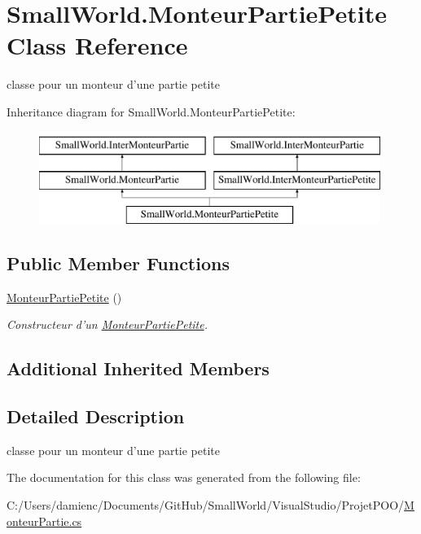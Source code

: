 \hypertarget{class_small_world_1_1_monteur_partie_petite}{\section{Small\-World.\-Monteur\-Partie\-Petite Class Reference}
\label{class_small_world_1_1_monteur_partie_petite}
}


classe pour un monteur d'une partie petite  


Inheritance diagram for Small\-World.\-Monteur\-Partie\-Petite\-:\begin{figure}[H]
\begin{center}
\leavevmode
\includegraphics[height=3.000000cm]{class_small_world_1_1_monteur_partie_petite}
\end{center}
\end{figure}
\subsection*{Public Member Functions}
\begin{DoxyCompactItemize}
\item 
\hypertarget{class_small_world_1_1_monteur_partie_petite_a9241a473b8a823da6141e9be321216a8}{\hyperlink{class_small_world_1_1_monteur_partie_petite_a9241a473b8a823da6141e9be321216a8}{Monteur\-Partie\-Petite} ()}\label{class_small_world_1_1_monteur_partie_petite_a9241a473b8a823da6141e9be321216a8}

\begin{DoxyCompactList}\small\item\em Constructeur d'un \hyperlink{class_small_world_1_1_monteur_partie_petite}{Monteur\-Partie\-Petite}. \end{DoxyCompactList}\end{DoxyCompactItemize}
\subsection*{Additional Inherited Members}


\subsection{Detailed Description}
classe pour un monteur d'une partie petite 

The documentation for this class was generated from the following file\-:\begin{DoxyCompactItemize}
\item 
C\-:/\-Users/damienc/\-Documents/\-Git\-Hub/\-Small\-World/\-Visual\-Studio/\-Projet\-P\-O\-O/\hyperlink{_monteur_partie_8cs}{Monteur\-Partie.\-cs}\end{DoxyCompactItemize}

